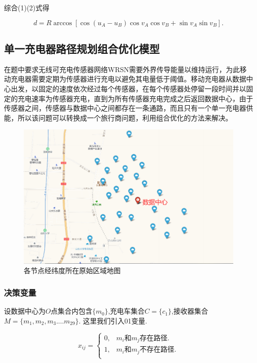 \documentclass{whutmod}
\begin{document}
综合(1)(2)式得

\begin{equation}
	d=R \arccos \left[\cos (u_{A}-u_{B})\cos v_{A} \cos v_{B}+\sin v_{A} \sin v_{B}\right].
\end{equation}

\subsection{单一充电器路径规划组合优化模型}
在题中要求无线可充电传感器网络WRSN需要外界传导能量以维持运行，为此移动充电器需要定期为传感器进行充电以避免其电量低于阈值。移动充电器从数据中心出发，以固定的速度依次经过每个传感器，在每个传感器处停留一段时间并以固定的充电速率为传感器充电，直到为所有传感器充电完成之后返回数据中心，由于传感器之间，传感器与数据中心之间都存在一条通路，而且只有一个单一充电器供能，所以该问题可以转换成一个旅行商问题，利用组合优化的方法来解决。
\begin{figure}[!htbp]
	\centering
	\includegraphics[width=.6\textwidth]{figures/origin.png}
	\caption{各节点经纬度所在原始区域地图}
\end{figure} 
\subsubsection{决策变量}
设数据中心为$O$点集合内包含$\{m_0\}$,充电车集合$C= \{c_{1}\}$,接收器集合$M=\{m_{1},m_{2},m_{3}....m_{29}\}$.
这里我们引入01变量.

\begin{equation}
	x_{ij}=\begin{cases} 
		0,&\text{$m_i$和$m_j$存在路径.} \\
		1,&\text{$m_i$和$m_j$不存在路径.} \\
	\end{cases}
\end{equation}
\end{document}
